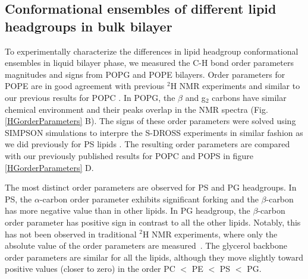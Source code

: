 \documentclass[aps,prl,superscriptaddress,twocolumn]{revtex4}
\begin{document}
\subsection{Conformational ensembles of different lipid headgroups in bulk bilayer}

To experimentally characterize the differences in lipid headgroup conformational ensembles
in liquid bilayer phase, we measured the C-H bond order parameters magnitudes and signs
from POPG and POPE bilayers.
Order parameters for POPE are in good agreement with previous $^2$H NMR experiments \cite{seelig76}
and similar to our previous results for POPC \cite{ferreira16}.
In POPG, the $\beta$ and g$_2$ carbons have similar chemical environment and their peaks
overlap in the NMR spectra (Fig. \ref{HGorderParameters} B).
The signs of these order parameters were solved using SIMPSON simulations to interpre the
S-DROSS experiments in similar fashion as we did previously for PS lipids \cite{antila19}.
The resulting order parameters are compared with our previously published results
for POPC \cite{ferreira13,ferreira16} and POPS \cite{antila19} in figure \ref{HGorderParameters} D.


The most distinct order parameters are observed for PS and PG headgroups.
In PS, the $\alpha$-carbon order parameter exhibits significant forking
and the $\beta$-carbon has more negative value than in other lipids.
In PG headgroup,
the $\beta$-carbon order parameter has positive sign in contrast to all the other lipids.
Notably, this has not been observed in traditional $^2$H NMR experiments,
where only the absolute value of the order parameters are measured~\cite{wohlgemuth80,gally81,borle85}.
The glycerol backbone order parameters are similar for all the lipids, although they move slightly toward
positive values (closer to zero) in the order PC $<$ PE $<$ PS $<$ PG. 
\end{document}
